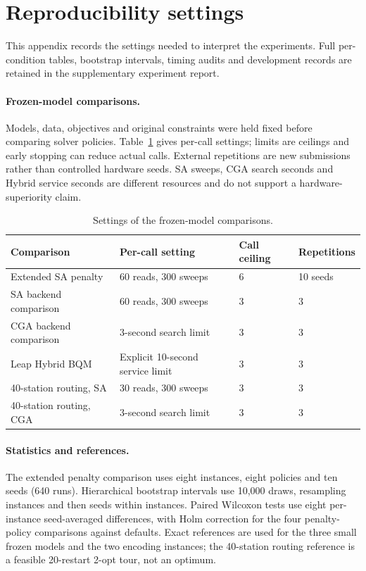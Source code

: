 \section{Reproducibility settings}
\label{app:details}
This appendix records the settings needed to interpret the experiments. Full per-condition tables,
bootstrap intervals, timing audits and development records are retained in the supplementary experiment report.

\paragraph{Frozen-model comparisons.}
Models, data, objectives and original constraints were held fixed before comparing solver policies.
Table~\ref{tab:solverprotocol} gives per-call settings; limits are ceilings and early stopping can reduce actual
calls. External repetitions are new submissions rather than controlled hardware seeds. SA sweeps, CGA search
seconds and Hybrid service seconds are different resources and do not support a hardware-superiority claim.

\begin{table}[h]
\centering\small
\caption{Settings of the frozen-model comparisons.}
\label{tab:solverprotocol}
\begin{tabular}{@{}lp{5.6cm}ll@{}}
\toprule
Comparison & Per-call setting & Call ceiling & Repetitions \\
\midrule
Extended SA penalty & 60 reads, 300 sweeps & 6 & 10 seeds \\
SA backend comparison & 60 reads, 300 sweeps & 3 & 3 \\
CGA backend comparison & 3-second search limit & 3 & 3 \\
Leap Hybrid BQM & Explicit 10-second service limit & 3 & 3 \\
40-station routing, SA & 30 reads, 300 sweeps & 3 & 3 \\
40-station routing, CGA & 3-second search limit & 3 & 3 \\
\bottomrule
\end{tabular}
\end{table}

\paragraph{Statistics and references.}
The extended penalty comparison uses eight instances, eight policies and ten seeds (640 runs). Hierarchical
bootstrap intervals use 10,000 draws, resampling instances and then seeds within instances. Paired Wilcoxon
tests use eight per-instance seed-averaged differences, with Holm correction for the four penalty-policy
comparisons against defaults. Exact references are used for the three small frozen models and the two encoding
instances; the 40-station routing reference is a feasible 20-restart 2-opt tour, not an optimum.

